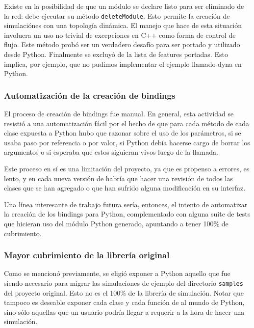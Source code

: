 \documentclass[]{article}
\begin{document}
Existe en \omnetpp{} la posibilidad de que un módulo se declare listo para ser
eliminado de la red: debe ejecutar su método \verb!deleteModule!. Esto permite la
creación de simulaciónes con una topología dinámica. El manejo que hace \omnetpp{}
de esta situación involucra un uso no trivial de excepciones en C++ como forma
de control de flujo. Este método probó ser un verdadero desafío para ser
portado y utilizado desde Python. Finalmente se excluyó de la lista de features
portadas. Esto implica, por ejemplo, que no pudimos implementar el ejemplo
llamado dyna en Python.

\subsubsection{Automatización de la creación de bindings}

El proceso de creación de bindings fue manual. En general, esta actividad se
resistió a una automatización fácil por el hecho de que para cada método de
cada clase expuesta a Python hubo que razonar sobre el uso de los parámetros,
si se usaba paso por referencia o por valor, si Python debía hacerse cargo de
borrar los argumentos o si \omnetpp{} esperaba que estos siguieran vivos luego de
la llamada.

Este proceso en sí es una limitación del proyecto, ya que es propenso a
errores, es lento, y en cada nueva versión de \omnetpp{} habría que hacer una
revisión de todos las clases que se han agregado o que han sufrido alguna
modificación en su interfaz.

Una línea interesante de trabajo futura sería, entonces, el intento de
automatizar la creación de los bindings para Python, complementado con alguna
suite de tests que hicieran uso del módulo Python generado, apuntando a tener
100\% de cubrimiento.

\subsubsection{Mayor cubrimiento de la librería original}

Como se mencionó previamente, se eligió exponer a Python aquello que fue siendo
necesario para migrar las simulaciones de ejemplo del directorio \verb!samples! del
proyecto original. Esto no es el 100\% de la librería de simulación. Notar que
tampoco es deseable exponer cada clase y cada función de \omnetpp{} al mundo de
Python, sino sólo aquellas que un usuario podría llegar a requerir a la hora de
hacer una simulación.
\end{document}
